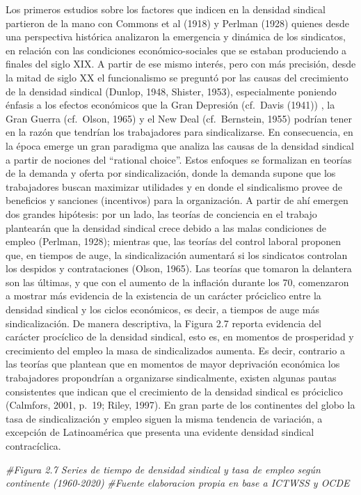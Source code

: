 \documentclass[
]{book}
\newenvironment{Shaded}{\begin{snugshade}}{\end{snugshade}}
\newcommand{\CommentTok}[1]{\textcolor[rgb]{0.56,0.35,0.01}{\textit{#1}}}
\begin{document}
Los primeros estudios sobre los factores que indicen en la densidad sindical partieron de la mano con Commons et al (1918) y Perlman (1928) quienes desde una perspectiva histórica analizaron la emergencia y dinámica de los sindicatos, en relación con las condiciones económico-sociales que se estaban produciendo a finales del siglo XIX. A partir de ese mismo interés, pero con más precisión, desde la mitad de siglo XX el funcionalismo se preguntó por las causas del crecimiento de la densidad sindical (Dunlop, 1948, Shister, 1953), especialmente poniendo énfasis a los efectos económicos que la Gran Depresión (cf.~Davis (1941)) , la Gran Guerra (cf.~Olson, 1965) y el New Deal (cf.~Bernstein, 1955) podrían tener en la razón que tendrían los trabajadores para sindicalizarse. En consecuencia, en la época emerge un gran paradigma que analiza las causas de la densidad sindical a partir de nociones del ``rational choice''. Estos enfoques se formalizan en teorías de la demanda y oferta por sindicalización, donde la demanda supone que los trabajadores buscan maximizar utilidades y en donde el sindicalismo provee de beneficios y sanciones (incentivos) para la organización. A partir de ahí emergen dos grandes hipótesis: por un lado, las teorías de conciencia en el trabajo plantearán que la densidad sindical crece debido a las malas condiciones de empleo (Perlman, 1928); mientras que, las teorías del control laboral proponen que, en tiempos de auge, la sindicalización aumentará si los sindicatos controlan los despidos y contrataciones (Olson, 1965).
Las teorías que tomaron la delantera son las últimas, y que con el aumento de la inflación durante los 70, comenzaron a mostrar más evidencia de la existencia de un carácter próciclico entre la densidad sindical y los ciclos económicos, es decir, a tiempos de auge más sindicalización.
De manera descriptiva, la Figura 2.7 reporta evidencia del carácter procíclico de la densidad sindical, esto es, en momentos de prosperidad y crecimiento del empleo la masa de sindicalizados aumenta. Es decir, contrario a las teorías que plantean que en momentos de mayor deprivación económica los trabajadores propondrían a organizarse sindicalmente, existen algunas pautas consistentes que indican que el crecimiento de la densidad sindical es próciclico (Calmfors, 2001, p.~19; Riley, 1997). En gran parte de los continentes del globo la tasa de sindicalización y empleo siguen la misma tendencia de variación, a excepción de Latinoamérica que presenta una evidente densidad sindical contracíclica.

\begin{Shaded}
\begin{Highlighting}[]
\CommentTok{#Figura 2.7 Series de tiempo de densidad sindical y tasa de empleo según continente (1960-2020)}
\CommentTok{#Fuente elaboracion propia en base a ICTWSS y OCDE}
\end{Highlighting}
\end{Shaded}
\end{document}
